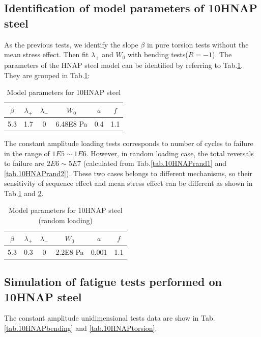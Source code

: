 \subsection{Identification of model parameters of 10HNAP steel}
As the previous tests, we identify the slope $\beta$ in pure torsion tests without the mean stress effect. Then fit $\lambda_+$ and $W_0$ with bending tests($R=-1$). The parameters of the HNAP steel model can be identified by referring to Tab.\ref{tab.10HNAP.para}. They are grouped in Tab.\ref{tab.10HNAP.para}:
\begin{table}[!h]
\centering
\begin{tabular}{|c|c|c|c|c|c|}
	\hline
	\textbf{$\beta$} & \textbf{$\lambda_+$} & \textbf{$\lambda_-$} & \textbf{$W_0$} & \textbf{$a$} & \textbf{$f$} \\ \hline
	5.3    & 1.7 &0         &6.48E8 Pa  & 0.4   & 1.1 \\ \hline
\end{tabular}
\caption{Model parameters for 10HNAP steel}
\label{tab.10HNAP.para}
\end{table}

The constant amplitude loading tests corresponds to number of cycles to failure in the range of $1E5\sim1E6$. However, in random loading case, the total reversals to failure are $2E6\sim5E7$ (calculated from Tab.\ref{tab.10HNAPrand1} and \ref{tab.10HNAPrand2}). These two cases belongs to different mechanisms, so their sensitivity of sequence effect and mean stress effect can be different as shown in Tab.\ref{tab.10HNAP.para} and \ref{tab.10HNAP.para.random}.

\begin{table}[!h]
	\centering
	\begin{tabular}{|c|c|c|c|c|c|}
		\hline
		\textbf{$\beta$} & \textbf{$\lambda_+$} & \textbf{$\lambda_-$} & \textbf{$W_0$} & \textbf{$a$} & \textbf{$f$} \\ \hline
		5.3    & 0.3 &0         &2.2E8 Pa  & 0.001   & 1.1 \\ \hline
	\end{tabular}
	\caption{Model parameters for 10HNAP steel (random loading)}
	\label{tab.10HNAP.para.random}
\end{table}

\newpage
\subsection{Simulation of fatigue tests performed on 10HNAP steel}
The constant amplitude unidimensional tests data are show in Tab.\ref{tab.10HNAPbending} and \ref{tab.10HNAPtorsion}.

